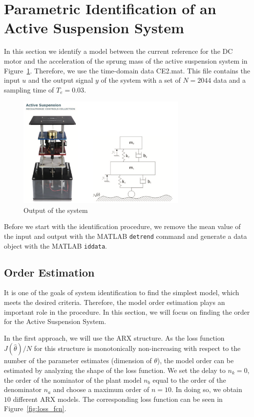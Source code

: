 \documentclass{scrartcl}
\begin{document}
\section{Parametric Identification of an Active Suspension System}
In this section we identify a model between the current reference for the DC motor and the acceleration of the sprung mass of the active suspension system in Figure~\ref{fig:active_suspension}. 
Therefore, we use the time-domain data CE2.mat. This file contains the input $u$ and the output signal $y$ of the system with a set of $N = 2044$ data and a sampling time of $T_e = 0.03$. 
\begin{figure}[h]
	\centering
	\includegraphics[height=5.5cm]{figures/active_suspension.png}
	\caption{Output of the system}\label{fig:active_suspension}
\end{figure}
Before we start with the identification procedure, we remove the mean value of the input and output with the MATLAB \texttt{detrend} command and generate a data object with the MATLAB \texttt{iddata}.

\subsection{Order Estimation}
It is one of the goals of system identification to find the simplest model, which meets the desired criteria. Therefore, the model order estimation plays an important role in the procedure. In this section, we will focus on finding the order for the Active Suspension System. 

In the first approach, we will use the ARX structure. As the loss function $ J(\hat{\theta}) /N $ for this structure is monotonically non-increasing with respect to the number of the parameter estimates (dimension of $\theta$), the model order can be estimated by analyzing the shape of the loss function. We set the delay to $n_k = 0$, the order of the nominator of the plant model $n_b$ equal to the order of the denominator $n_a$ and choose a maximum order of $n=10$. In doing so, we obtain $10$ different ARX models. The corresponding loss function can be seen in Figure~\ref{fig:loss_fcn}. 
\end{document}
